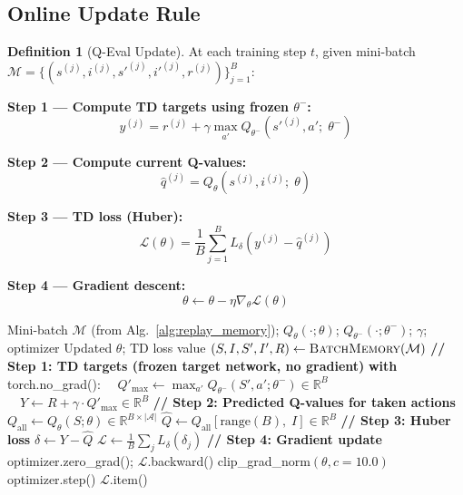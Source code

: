 \documentclass[12pt,a4paper]{article}
\theoremstyle{definition}
\newtheorem{definition}{Definition}[section]
\theoremstyle{plain}
\theoremstyle{remark}
\newcommand{\R}{\mathbb{R}}
\newcommand{\Loss}{\mathcal{L}}
\newcommand{\Qeval}{Q_\theta}
\newcommand{\Qtgt}{Q_{\theta^-}}
\begin{document}
\subsection{Online Update Rule}

\begin{definition}[Q-Eval Update]
At each training step $t$, given mini-batch $\mathcal{M} = \{(s^{(j)}, i^{(j)}, {s'}^{(j)}, {i'}^{(j)}, r^{(j)})\}_{j=1}^B$:

\textbf{Step 1 — Compute TD targets using frozen $\theta^-$:}
\[
  y^{(j)} = r^{(j)} + \gamma \max_{a'} \Qtgt(s'^{(j)}, a';\; \theta^-)
\]

\textbf{Step 2 — Compute current Q-values:}
\[
  \hat{q}^{(j)} = \Qeval(s^{(j)}, i^{(j)};\; \theta)
\]

\textbf{Step 3 — TD loss (Huber):}
\[
  \Loss(\theta) = \frac{1}{B}\sum_{j=1}^B L_\delta\!\left(y^{(j)} - \hat{q}^{(j)}\right)
\]

\textbf{Step 4 — Gradient descent:}
\[
  \theta \gets \theta - \eta \nabla_\theta \Loss(\theta)
\]
\end{definition}

\begin{algorithm}[H]
\caption{Q-Eval Network Training Step}
\label{alg:qeval_step}
\begin{algorithmic}[1]
\Require Mini-batch $\mathcal{M}$ (from Alg.~\ref{alg:replay_memory}); $\Qeval(\cdot;\theta)$; $\Qtgt(\cdot;\theta^-)$; $\gamma$; optimizer
\Ensure Updated $\theta$; TD loss value
\State $(S, I, S', I', R) \gets \textsc{BatchMemory}(\mathcal{M})$ 
\State \textbf{// Step 1: TD targets (frozen target network, no gradient)}
\State \textbf{with} torch.no\_grad():
\State $\quad Q'_{\text{max}} \gets \max_{a'} \Qtgt(S', a';\theta^-) \in \R^B$
\State $\quad Y \gets R + \gamma \cdot Q'_{\text{max}} \in \R^B$
\State \textbf{// Step 2: Predicted Q-values for taken actions}
\State $Q_{\text{all}} \gets \Qeval(S;\theta) \in \R^{B \times |\mathcal{A}|}$
\State $\hat{Q} \gets Q_{\text{all}}[\text{range}(B),\; I] \in \R^B$
\State \textbf{// Step 3: Huber loss}
\State $\delta \gets Y - \hat{Q}$ \Comment{TD error $\in \R^B$}
\State $\Loss \gets \frac{1}{B}\sum_j L_\delta(\delta_j)$
\State \textbf{// Step 4: Gradient update}
\State optimizer.zero\_grad(); $\Loss$.backward()
\State clip\_grad\_norm$(\theta, c=10.0)$
\State optimizer.step()
\State \Return $\Loss$.item()
\end{algorithmic}
\end{algorithm}
\end{document}
